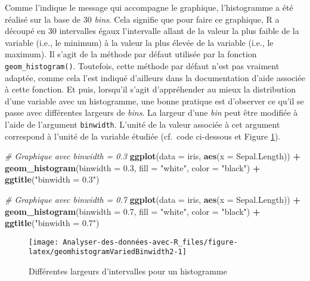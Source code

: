 \documentclass[
  french,
]{book}
\newenvironment{Shaded}{\begin{snugshade}}{\end{snugshade}}
\newcommand{\CommentTok}[1]{\textcolor[rgb]{0.56,0.35,0.01}{\textit{#1}}}
\newcommand{\DataTypeTok}[1]{\textcolor[rgb]{0.13,0.29,0.53}{#1}}
\newcommand{\FloatTok}[1]{\textcolor[rgb]{0.00,0.00,0.81}{#1}}
\newcommand{\KeywordTok}[1]{\textcolor[rgb]{0.13,0.29,0.53}{\textbf{#1}}}
\newcommand{\NormalTok}[1]{#1}
\newcommand{\OperatorTok}[1]{\textcolor[rgb]{0.81,0.36,0.00}{\textbf{#1}}}
\newcommand{\StringTok}[1]{\textcolor[rgb]{0.31,0.60,0.02}{#1}}
\begin{document}
Comme l'indique le message qui accompagne le graphique, l'histogramme a été réalisé sur la base de 30 \emph{bins}. Cela signifie que pour faire ce graphique, R a découpé en 30 intervalles égaux l'intervalle allant de la valeur la plus faible de la variable (i.e., le minimum) à la valeur la plus élevée de la variable (i.e., le maximum). Il s'agit de la méthode par défaut utilisée par la fonction \texttt{geom\_histogram()}. Toutefois, cette méthode par défaut n'est pas vraiment adaptée, comme cela l'est indiqué d'ailleurs dans la documentation d'aide associée à cette fonction. Et puis, lorsqu'il s'agit d'appréhender au mieux la distribution d'une variable avec un histogramme, une bonne pratique est d'observer ce qu'il se passe avec différentes largeurs de \emph{bins}. La largeur d'une \emph{bin} peut être modifiée à l'aide de l'argument \texttt{binwidth}. L'unité de la valeur associée à cet argument correspond à l'unité de la variable étudiée (cf.~code ci-dessous et Figure \ref{fig:geomhistogramVariedBinwidth2}).

\begin{Shaded}
\begin{Highlighting}[]
\CommentTok{# Graphique avec binwidth = 0.3}
\KeywordTok{ggplot}\NormalTok{(}\DataTypeTok{data =}\NormalTok{ iris, }\KeywordTok{aes}\NormalTok{(}\DataTypeTok{x =}\NormalTok{ Sepal.Length)) }\OperatorTok{+}\StringTok{ }
\StringTok{  }\KeywordTok{geom_histogram}\NormalTok{(}\DataTypeTok{binwidth  =} \FloatTok{0.3}\NormalTok{, }\DataTypeTok{fill =} \StringTok{"white"}\NormalTok{, }\DataTypeTok{color =} \StringTok{"black"}\NormalTok{) }\OperatorTok{+}
\StringTok{  }\KeywordTok{ggtitle}\NormalTok{(}\StringTok{"binwidth = 0.3"}\NormalTok{)}

\CommentTok{# Graphique avec binwidth = 0.7}
\KeywordTok{ggplot}\NormalTok{(}\DataTypeTok{data =}\NormalTok{ iris, }\KeywordTok{aes}\NormalTok{(}\DataTypeTok{x =}\NormalTok{ Sepal.Length)) }\OperatorTok{+}\StringTok{ }
\StringTok{  }\KeywordTok{geom_histogram}\NormalTok{(}\DataTypeTok{binwidth  =} \FloatTok{0.7}\NormalTok{, }\DataTypeTok{fill =} \StringTok{"white"}\NormalTok{, }\DataTypeTok{color =} \StringTok{"black"}\NormalTok{) }\OperatorTok{+}
\StringTok{  }\KeywordTok{ggtitle}\NormalTok{(}\StringTok{"binwidth = 0.7"}\NormalTok{)}
\end{Highlighting}
\end{Shaded}

\begin{figure}

{\centering \texttt{[image: Analyser-des-données-avec-R\_files/figure-latex/geomhistogramVariedBinwidth2-1]} 

}

\caption{Différentes largeurs d'intervalles pour un histogramme}\label{fig:geomhistogramVariedBinwidth2}
\end{figure}
\end{document}
